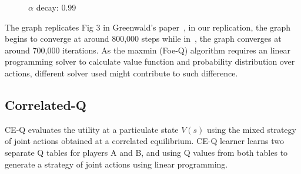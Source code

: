 \documentclass[conference]{IEEEtran}
\begin{document}
\begin{figure}[htbp]
\centering
{}%
%
\centering
\caption{$\alpha$ decay: 0.99}
\label{fig:FoQ2}
\end{figure}

The graph replicates Fig 3 in Greenwald's paper~\cite{b1}, in our replication, the graph begins to converge at around 800,000 steps while in~\cite{b1}, the graph converges at around 700,000 iterations. As the maxmin (Foe-Q) algorithm requires an linear programming solver to calculate value function and probability distribution over actions, different solver used might contribute to such difference.

\subsection{Correlated-Q}

CE-Q evaluates the utility at a particulate state $V(s)$ using the mixed strategy of joint actions obtained at a correlated equilibrium. CE-Q learner learns two separate Q tables for players A and B, and using Q values from both tables to generate a strategy of joint actions using linear programming. 
\end{document}
